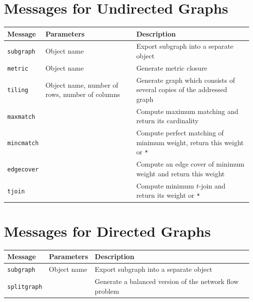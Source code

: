 \documentclass[a4paper,11pt,twoside]{book}
\begin{document}
\section{Messages for Undirected Graphs}
\label{slb_undirected_messages}
\medskip
\begin{center}
\begin{tabular}{|p{3cm}|p{8cm}|p{12.5cm}|}
\hline
{\bf Message}       & {\bf Parameters} & {\bf Description} \\
\hline
\hline
\verb/subgraph/     & Object name & Export subgraph into a separate object \\
\hline
\verb/metric/       & Object name & Generate metric closure \\
\hline
\verb/tiling/       & Object name, number of rows, number of columns
                    &  Generate graph which consists of several copies of
                    the addressed graph \\
\hline
\verb/maxmatch/     & & Compute maximum matching and return its cardinality \\
\hline
\verb/mincmatch/    & & Compute perfect matching of minimum weight, return
                        this weight or \verb/*/ \\
\hline
\verb/edgecover/    & & Compute an edge cover of minimum weight and return
                        this weight \\
\hline
\verb/tjoin/        & & Compute minimum $t$-join and return its weight or \verb/*/ \\
\hline
\end{tabular}
\end{center}


\section{Messages for Directed Graphs}
\label{slb_directed_messages}
\medskip
\begin{center}
\begin{tabular}{|p{3cm}|p{8cm}|p{12.5cm}|}
\hline
{\bf Message}       & {\bf Parameters} & {\bf Description} \\
\hline
\hline
\verb/subgraph/     & Object name & Export subgraph into a separate object \\
\hline
\verb/splitgraph/   & & Generate a balanced version of the network flow problem \\
\hline
\end{tabular}
\end{center}
\end{document}

